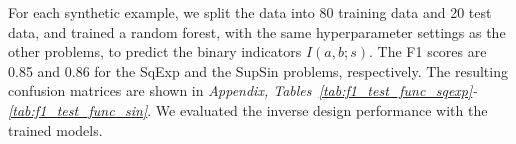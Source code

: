 \documentclass{article}
\begin{document}


For each synthetic example, we split the data into 80 training data and 20 test data, and trained a random forest, with the same hyperparameter settings as the other problems, to predict the binary indicators $I(a,b; s)$. The F1 scores are 0.85 and 0.86 for the SqExp and the SupSin problems, respectively. The resulting confusion matrices are shown in \textit{Appendix, Tables~\ref{tab:f1_test_func_sqexp}-\ref{tab:f1_test_func_sin}}. We evaluated the inverse design performance with the trained models.
\end{document}
